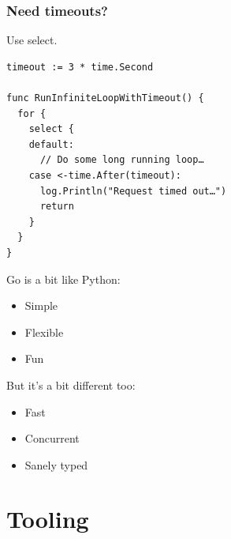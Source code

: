\documentclass[xelatex,aspectratio=169]{beamer}
\begin{document}
\begin{frame}[fragile]
	\frametitle{Need timeouts?}
	Use select.
\tiny
\begin{verbatim}
timeout := 3 * time.Second

func RunInfiniteLoopWithTimeout() {
  for {
    select {
    default:
      // Do some long running loop…
    case <-time.After(timeout):
      log.Println("Request timed out…")
      return
    }
  }
}
\end{verbatim}
\end{frame}

\begin{frame}
	Go is a bit like Python:
	\begin{itemize}
			\item Simple
			\item Flexible
			\item Fun
	\end{itemize}
	But it's a bit different too:
	\begin{itemize}
			\item Fast
			\item Concurrent
			\item Sanely typed
	\end{itemize}
\end{frame}


\section[]{Tooling}
\frame{\sectionpage}
\end{document}
